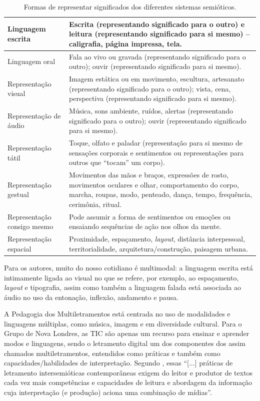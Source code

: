 \documentclass{textolivre}
\begin{document}
\begin{table}[htpb]
\caption{Formas de representar significados dos diferentes sistemas semióticos.}
\label{tbl03}
\begin{tabular}{lp{8cm}}
\toprule
Linguagem escrita & Escrita (representando significado para o outro) e leitura (representando significado para si mesmo) – caligrafia, página impressa, tela. \\
\midrule
Linguagem oral & Fala ao vivo ou gravada (representando significado para o outro); ouvir (representando significado para si mesmo). \\
\midrule 
Representação visual & Imagem estática ou em movimento, escultura, artesanato (representando significado para o outro); vista, cena, perspectiva (representando significado para si mesmo). \\
\midrule
Representação de áudio & Música, sons ambiente, ruídos, alertas (representando significado para o outro); ouvir (representando significado para si mesmo). \\
\midrule
Representação tátil & Toque, olfato e paladar (representação para si mesmo de sensações corporais e sentimentos ou representações para outros que “tocam” um corpo). \\
\midrule
Representação gestual & Movimentos das mãos e braços, expressões de rosto, movimentos oculares e olhar, comportamento do corpo, marcha, roupas, modo, penteado, dança, tempo, frequência, cerimônia, ritual. \\
\midrule
Representação consigo mesmo & Pode assumir a forma de sentimentos ou emoções ou ensaiando sequências de ação nos olhos da mente. \\
\midrule
Representação espacial & Proximidade, espaçamento, \emph{layout}, distância interpessoal, territorialidade, arquitetura/construção, paisagem urbana. \\
\bottomrule
\end{tabular}
\end{table}


Para os autores, muito do nosso cotidiano é multimodal: a linguagem escrita
está intimamente ligada ao visual no que se refere, por exemplo, ao
espaçamento, \emph{layout} e tipografia, assim como também a linguagem falada está
associada ao áudio no uso da entonação, inflexão, andamento e pausa.

A Pedagogia dos Multiletramentos está centrada no uso de modalidades e
linguagens múltiplas, como música, imagem e em diversidade cultural. Para o
Grupo de Nova Londres, as TIC são apenas um recurso para ensinar e aprender
modos e linguagens, sendo o letramento digital um dos componentes dos assim
chamados multiletramentos, entendidos como práticas e também como
capacidades/habilidades de interpretação. Segundo \textcite[p. 81]{kleiman2014}, essas
“[...] práticas de letramento intersemióticas contemporâneas exigem do leitor e
produtor de textos cada vez mais competências e capacidades de leitura e
abordagem da informação cuja interpretação (e produção) aciona uma combinação
de mídias”.
\end{document}
